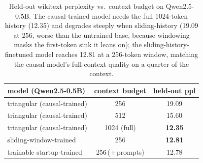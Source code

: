 \begin{table}[t]
\centering
\small
\begin{tabular}{lcc}
\toprule
model (Qwen2.5-0.5B) & context budget & held-out ppl \\
\midrule
triangular (causal-trained) & 256 & 19.09 \\
triangular (causal-trained) & 512 & 15.60 \\
triangular (causal-trained) & 1024 (full) & \textbf{12.35} \\
sliding-window-trained & 256 & \textbf{12.81} \\
trainable startup-trained & 256\,($+$\,prompts) & 12.78 \\
\bottomrule
\end{tabular}
\caption{Held-out wikitext perplexity vs.\ context budget on Qwen2.5-0.5B. The causal-trained model needs the full 1024-token history (12.35) and degrades steeply when sliding-history (19.09 at 256, worse than the untrained base, because windowing masks the first-token sink it leans on); the sliding-history-finetuned model reaches 12.81 at a 256-token window, matching the causal model's full-context quality on a quarter of the context.}
\label{tab:ppl05b}
\end{table}
